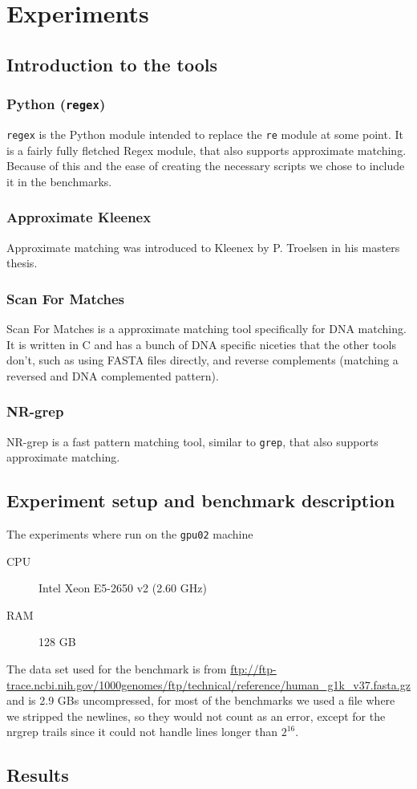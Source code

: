 \section{Experiments}

\subsection{Introduction to the tools}
\subsubsection{Python (\texttt{regex})}
\texttt{regex} is the Python module intended to replace the \texttt{re} module
at some point. It is a fairly fully fletched Regex module, that also supports
approximate matching. Because of this and the ease of creating the necessary
scripts we chose to include it in the benchmarks.

\subsubsection{Approximate Kleenex}
Approximate matching was introduced to Kleenex by P. Troelsen in his masters
thesis\cite{approx-kex}.

\subsubsection{Scan For Matches}
Scan For Matches is a approximate matching tool specifically for DNA matching.
It is written in C and has a bunch of DNA specific niceties that the other
tools don't, such as using FASTA files directly, and reverse complements
(matching a reversed and DNA complemented pattern).

\subsubsection{NR-grep}
NR-grep\cite{nrgrep} is a fast pattern matching tool, similar to \texttt{grep},
that also supports approximate matching.


\subsection{Experiment setup and benchmark description}
The experiments where run on the \texttt{gpu02} machine
\begin{description}
    \item[CPU] Intel Xeon E5-2650 v2 (2.60 GHz)
    \item[RAM] 128 GB
\end{description}

The data set used for the benchmark is from
\url{ftp://ftp-trace.ncbi.nih.gov/1000genomes/ftp/technical/reference/human_g1k_v37.fasta.gz}
and is 2.9 GBs uncompressed, for most of the benchmarks we used a file where we
stripped the newlines, so they would not count as an error, except for the
nrgrep trails since it could not handle lines longer than $2^{16}$.


\subsection{Results}

